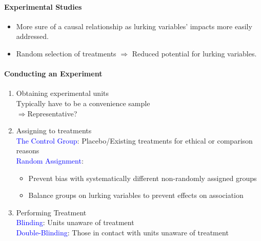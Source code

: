 \paragraph{Experimental Studies}
\begin{itemize}
	\item More sure of a causal relationship as lurking variables' impacts more easily addressed.
	\item Random selection of treatments $\Rightarrow$ Reduced potential for lurking variables.
\end{itemize}
\paragraph{Conducting an Experiment}
\begin{enumerate}
	\item Obtaining experimental units\\
		Typically have to be a convenience sample\\
		$\Rightarrow$\textcolor{Bittersweet}{Representative?}
	\item Assigning to treatments\\
		\textcolor{Blue}{The Control Group}: Placebo/Existing treatments for ethical or comparison reasons\\
		\textcolor{Blue}{Random Assignment}:
		\begin{itemize}
			\item Prevent bias with systematically different non-randomly assigned groups\\
			\item Balance groups on lurking variables to prevent effects on association
		\end{itemize}
	\item Performing Treatment\\
		\textcolor{Blue}{Blinding}: Units unaware of treatment\\
		\textcolor{Blue}{Double-Blinding}: Those in contact with units unaware of treatment
\end{enumerate}
